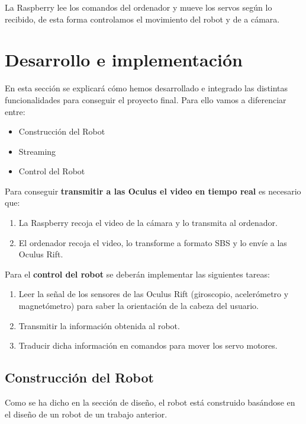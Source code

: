 \documentclass[twoside, 12pt]{epstfg}
\begin{document}
La Raspberry lee los comandos del ordenador y mueve los servos según lo recibido, de esta forma controlamos el movimiento del robot y de a cámara.

\newpage
\chapter{Desarrollo e implementación}


En esta sección se explicará cómo hemos desarrollado e integrado las distintas funcionalidades para conseguir el proyecto final.
Para ello vamos a diferenciar entre:

\begin{itemize}
	\item Construcción del Robot
	\item Streaming 
	\item Control del Robot
\end{itemize}

Para conseguir \textbf{transmitir a las Oculus el video en tiempo real} es necesario que:
\begin{enumerate}
	\item La Raspberry recoja el video de la cámara y lo transmita al ordenador.
	
	\item El ordenador recoja el video, lo transforme a formato SBS y lo envíe a las Oculus Rift. 
	
\end{enumerate}





Para el \textbf{control del robot} se deberán implementar las siguientes tareas:

\begin{enumerate}
	\item Leer la señal de los sensores de las Oculus Rift (giroscopio, acelerómetro y magnetómetro) para saber la orientación de la cabeza del usuario.
	
	\item Transmitir la información obtenida al robot.
	
	\item Traducir dicha información en comandos para mover los servo motores.
\end{enumerate} 
\section{Construcción del Robot}
Como se ha dicho en la sección de diseño, el robot está construido basándose en el diseño de un robot de un trabajo anterior.
\end{document}
